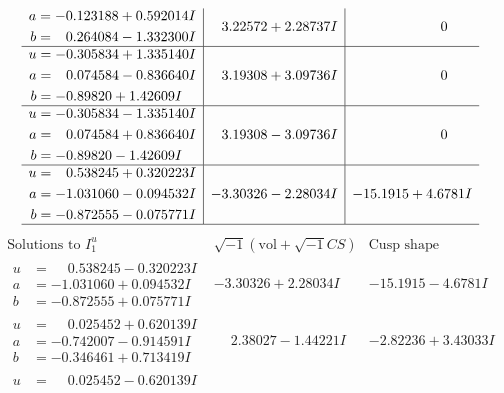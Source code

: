 \documentclass[1p]{elsarticle_modified}
\theoremstyle{definition}
\newcommand{\I}{\sqrt{-1}}
\begin{document}
$$\begin{array}{c|c|c}
\begin{aligned}
a &= -0.123188 + 0.592014 I \\
b &= \phantom{-}0.264084 - 1.332300 I\end{aligned}
 & \phantom{-}3.22572 + 2.28737 I & \phantom{-0.000000 } 0 \\ \hline\begin{aligned}
u &= -0.305834 + 1.335140 I \\
a &= \phantom{-}0.074584 - 0.836640 I \\
b &= -0.89820 + 1.42609 I\end{aligned}
 & \phantom{-}3.19308 + 3.09736 I & \phantom{-0.000000 } 0 \\ \hline\begin{aligned}
u &= -0.305834 - 1.335140 I \\
a &= \phantom{-}0.074584 + 0.836640 I \\
b &= -0.89820 - 1.42609 I\end{aligned}
 & \phantom{-}3.19308 - 3.09736 I & \phantom{-0.000000 } 0 \\ \hline\begin{aligned}
u &= \phantom{-}0.538245 + 0.320223 I \\
a &= -1.031060 - 0.094532 I \\
b &= -0.872555 - 0.075771 I\end{aligned}
 & -3.30326 - 2.28034 I & -15.1915 + 4.6781 I\\
 \hline 
 \end{array}$$\newpage$$\begin{array}{c|c|c}  
\text{Solutions to }I^u_{1}& \I (\text{vol} + \sqrt{-1}CS) & \text{Cusp shape}\\
 \hline 
\begin{aligned}
u &= \phantom{-}0.538245 - 0.320223 I \\
a &= -1.031060 + 0.094532 I \\
b &= -0.872555 + 0.075771 I\end{aligned}
 & -3.30326 + 2.28034 I & -15.1915 - 4.6781 I \\ \hline\begin{aligned}
u &= \phantom{-}0.025452 + 0.620139 I \\
a &= -0.742007 - 0.914591 I \\
b &= -0.346461 + 0.713419 I\end{aligned}
 & \phantom{-}2.38027 - 1.44221 I & -2.82236 + 3.43033 I \\ \hline\begin{aligned}
u &= \phantom{-}0.025452 - 0.620139 I \\

\end{aligned}
\end{array}$$
\end{document}
